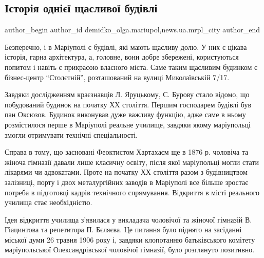  
 
 
 
 
 
\subsection{Історія однієї щасливої будівлі}
\label{sec:17_10_2017.stz.news.ua.mrpl_city.1.istoria_odniei_schaslyvoj_budivli}
 
\ifcmt
 author_begin
   author_id demidko_olga.mariupol,news.ua.mrpl_city
 author_end
\fi

Безперечно, і в Маріуполі є будівлі, які мають щасливу долю. У них є цікава
історія, гарна архітектура, а, головне, вони добре збережені, користуються
попитом і навіть є прикрасою власного міста. Саме таким щасливим будинком є
бізнес-центр \enquote{Столєтній}, розташований на вулиці Миколаївській 7/17.


Завдяки дослідженням краєзнавців Л. Яруцькому, С. Бурову стало відомо, що
побудований будинок на початку ХХ століття. Першим господарем будівлі був пан
Оксюзов. Будинок виконував дуже важливу функцію, адже саме в ньому розмістилося
перше в Маріуполі реальне училище, завдяки якому маріупольці змогли отримувати
технічні спеціальності.

Справа в тому, що засновані Феоктистом Хартахаєм ще в 1876 р. чоловіча та
жіноча гімназії давали лише класичну освіту, після якої маріупольці могли стати
лікарями чи адвокатами. Проте на початку ХХ століття разом з будівництвом
залізниці, порту і двох металургійних заводів в Маріуполі все більше зростає
потреба в підготовці кадрів технічного спрямування. Відкриття в місті реального
училища стає необхідністю.

Ідея відкриття училища з'явилася у викладача чоловічої та жіночої гімназій В.
Гіацинтова та репетитора П. Бєляєва. Це питання було піднято на засіданні
міської думи 26 травня 1906 року і, завдяки клопотанню батьківського комітету
маріупольської Олександрівської чоловічої гімназії, було розглянуто позитивно.

